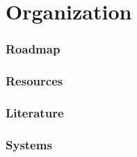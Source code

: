 \part{Organization}
\section{Roadmap}

\section{Resources}

\section{Literature}


\section{Systems}


%
